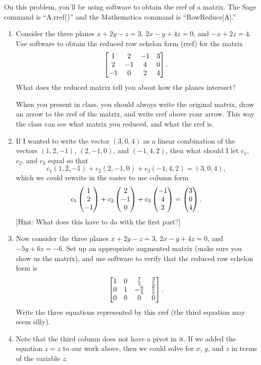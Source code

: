 \begin{problem}
On this problem, you'll be using software to obtain the rref of a matrix.  The Sage command is ``A.rref()'' and the Mathematica command is ``RowReduce[A].'' 
%
\begin{enumerate}
 \item 
Consider the three planes $x+2y-z=3$, $2x-y+4z=0$, and $-x+2z=4$.  
Use software to obtain the reduced row echelon form (rref) for the matrix
$$
\begin{bmatrix} 
1&2&-1&3\\
2&-1&4&0\\
-1&0&2&4
 \end{bmatrix}.
$$  
What does the reduced matrix tell you about how the planes intersect?

When you present in class, you should always write the original matrix, draw an arrow to the rref of the matrix, and write rref above your arrow. This way the class can see what matrix you reduced, and what the rref is. 
 \item
If I wanted to write the vector $(3,0,4)$ as a linear combination of the vectors $(1,2,-1)$, $(2,-1,0)$, and $(-1,4,2)$, then what should I let $c_1$, $c_2$, and $c_3$ equal so that 
$$ c_1(1,2,-1)+c_2(2,-1,0)+c_3(-1,4,2)=(3,0,4),$$ 
which we could rewrite in the easier to use column form
$$ c_1\begin{pmatrix} 1\\2\\-1 \end{pmatrix}+c_2\begin{pmatrix} 2\\-1\\0 \end{pmatrix}+c_3\begin{pmatrix} -1\\4\\2 \end{pmatrix}=\begin{pmatrix} 3\\0\\4 \end{pmatrix}.$$
[Hint: What does this have to do with the first part?] 
 \item
Now consider the three planes $x+2y-z=3$, $2x-y+4z=0$, and $-5y+6z=-6$.  
Set up an appropriate augmented matrix (make sure you show us the matrix), and use software to verify that the reduced row echelon form is
$$
\begin{bmatrix} 
1 & 0 & \frac{7}{5} & \frac{3}{5} \\
0 & 1 & -\frac{6}{5} & \frac{6}{5} \\
0 & 0 & 0 & 0
 \end{bmatrix}.
$$
Write the three equations represented by this rref (the third equation may seem silly). 
\item Note that the third column does not have a pivot in it. If we added the equation $z=z$ to our work above, then we could solve for $x$, $y$, and $z$ in terms of the variable $z$. 

\end{enumerate}
\end{problem}

